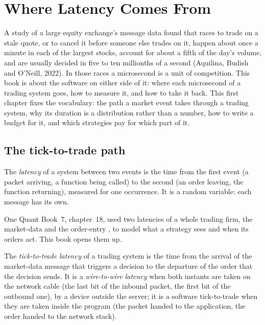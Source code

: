 \chapter{Where Latency Comes From}\label{ch:ll:where-latency-comes-from}

A study of a large equity exchange's message data found that races to trade on a stale quote, or to cancel it
before someone else trades on it, happen about once a minute in each of the largest stocks, account for about a
fifth of the day's volume, and are usually decided in five to ten millionths of a second (Aquilina, Budish and
O'Neill, 2022). In those races a microsecond is a unit of competition. This book is about the software on either
side of it: where each microsecond of a trading system goes, how to measure it, and how to take it back. This first
chapter fixes the vocabulary: the path a market event takes through a trading system, why its duration is a
distribution rather than a number, how to write a budget for it, and which strategies pay for which part of it.

\section{The tick-to-trade path}

\begin{definition}[Latency]\label{def:ll:where-latency-comes-from:latency}
The \emph{latency} of a system between two events is the time from the first event (a packet
arriving, a function being called) to the second (an order leaving, the function returning), measured for one
occurrence. It is a random variable: each message has its own.
\end{definition}

One Quant Book~7, chapter~18, used two latencies of a whole trading firm, the market-data  and the
order-entry , to model what a strategy sees and when its orders act. This book opens them up.

\begin{definition}\label{def:ll:where-latency-comes-from:t2t}
The \emph{tick-to-trade latency} of a trading system is the time from the arrival of
the market-data message that triggers a decision to the departure of the order that the decision sends. It is a
\emph{wire-to-wire latency} when both instants are taken on the network cable (the last
bit of the inbound packet, the first bit of the outbound one), by a device outside the server; it is a software
tick-to-trade  when they are taken inside the program (the packet handed to the application, the order handed
to the network stack).
\end{definition}

